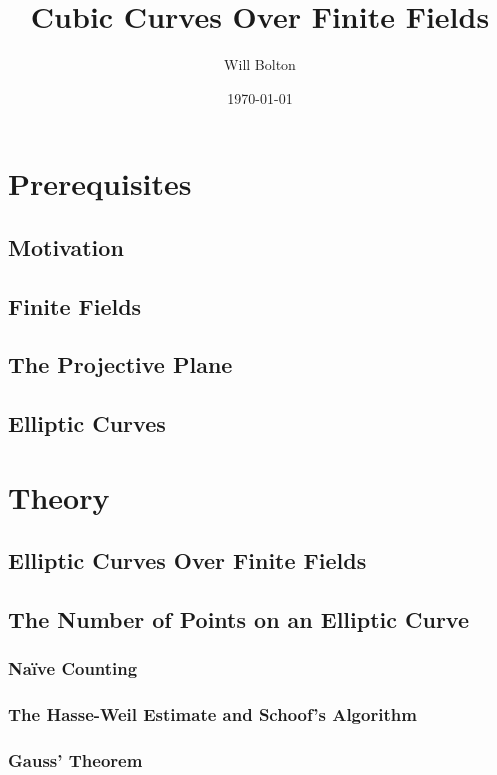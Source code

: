 \documentclass[a4paper,12pt,titlepage,oneside]{article}
\title{Cubic Curves Over Finite Fields}
\author{Will Bolton}
\date{\today}
\begin{document}
\maketitle
\tableofcontents
\clearpage

\section{Prerequisites}
\subsection{Motivation}

\nocite{*}
\subsection{Finite Fields}

\subsection{The Projective Plane}

\subsection{Elliptic Curves}

\clearpage

\section{Theory}
\subsection{Elliptic Curves Over Finite Fields}

\subsection{The Number of Points on an Elliptic Curve}
\subsubsection{Naïve Counting} %
\lipsum[1-3]
\subsubsection{The Hasse-Weil Estimate and Schoof's Algorithm}

\subsubsection{Gauss' Theorem}

\end{document}

